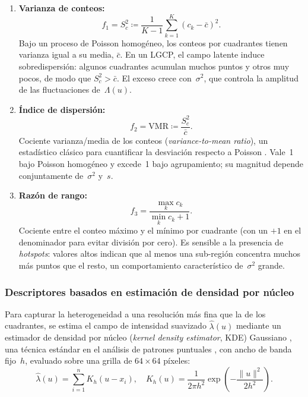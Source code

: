 \documentclass[a4paper,fleqn]{cas-sc}
\numberwithin{equation}{section}
\begin{document}
\begin{enumerate}[label=(\roman*),leftmargin=*,itemsep=0.6em]
\item \textbf{Varianza de conteos:}
\begin{equation}
f_1 = S_c^2 \coloneqq \frac{1}{K-1}\sum_{k=1}^{K}(c_k - \bar{c})^2.
\label{eq:f1_var_c}
\end{equation}
Bajo un proceso de Poisson homog\'eneo, los conteos por cuadrantes tienen varianza igual a su media, $\bar{c}$. En un LGCP, el campo latente induce sobredispersi\'on: algunos cuadrantes acumulan muchos puntos y otros muy pocos, de modo que $S_c^2 > \bar{c}$. El exceso crece con~$\sigma^2$, que controla la amplitud de las fluctuaciones de~$\Lambda(u)$.

\item \textbf{\'Indice de dispersi\'on:}
\begin{equation}
f_2 = \mathrm{VMR} \coloneqq \frac{S_c^2}{\bar{c}}.
\label{eq:f2_vmr}
\end{equation}
Cociente varianza/media de los conteos (\textit{variance-to-mean ratio}), un estad\'istico cl\'asico para cuantificar la desviaci\'on respecto a Poisson \citep{Diggle2014}. Vale~1 bajo Poisson homog\'eneo y excede~1 bajo agrupamiento; su magnitud depende conjuntamente de~$\sigma^2$ y~$s$.

\item \textbf{Raz\'on de rango:}
\begin{equation}
f_3 = \frac{\max_k c_k}{\min_k c_k + 1}.
\label{eq:f3_range}
\end{equation}
Cociente entre el conteo m\'aximo y el m\'inimo por cuadrante (con un $+1$ en el denominador para evitar divisi\'on por cero). Es sensible a la presencia de \emph{hotspots}: valores altos indican que al menos una sub-regi\'on concentra muchos m\'as puntos que el resto, un comportamiento caracter\'istico de~$\sigma^2$ grande.
\end{enumerate}

\subsubsection{Descriptores basados en estimaci\'on de densidad por n\'ucleo}

Para capturar la heterogeneidad a una resoluci\'on m\'as fina que la de los
cuadrantes, se estima el campo de intensidad suavizado $\hat{\lambda}(u)$
mediante un estimador de densidad por n\'ucleo (\textit{kernel density
estimator}, KDE) Gaussiano \citep{Silverman1986}, una t\'ecnica est\'andar
en el an\'alisis de patrones puntuales \citep{Illian2008, WiegandMoloney2013},
con ancho de banda fijo~$h$, evaluado sobre una grilla de
$64\times 64$ p\'ixeles:
\begin{equation}
    \hat{\lambda}(u) = \sum_{i=1}^{n} K_h(u - x_i), \quad
    K_h(u) = \frac{1}{2\pi h^2}\exp\!\left(-\frac{\|u\|^2}{2h^2}\right).
    \label{eq:kde}
\end{equation}
\end{document}
